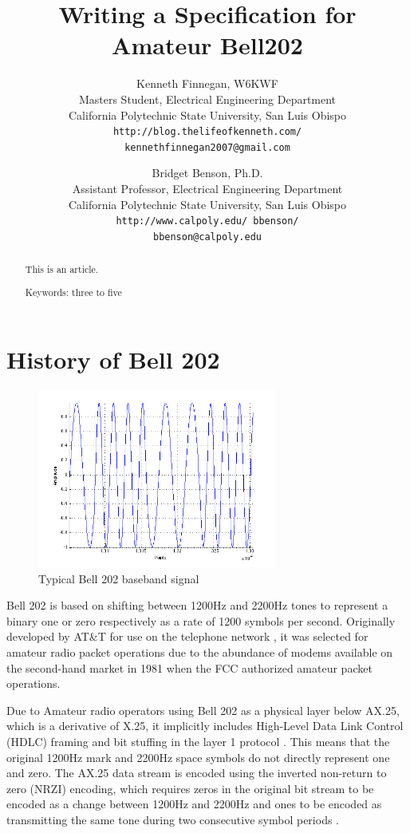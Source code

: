 \documentclass[12pt,letterpaper]{article}
\title{Writing a Specification for Amateur Bell202}
\author{Kenneth Finnegan, W6KWF\\
\small Masters Student, Electrical Engineering Department\\
\small California Polytechnic State University, San Luis Obispo\\
\small \texttt{http://blog.thelifeofkenneth.com/}\\
\small \texttt{kennethfinnegan2007@gmail.com}\\
\and
Bridget Benson, Ph.D.\\
\small Assistant Professor, Electrical Engineering Department\\
\small California Polytechnic State University, San Luis Obispo\\
\small \texttt{http://www.calpoly.edu/~bbenson/}\\
\small \texttt{bbenson@calpoly.edu}}
\begin{document}
\maketitle

\begin{abstract}
	This is an article.

	Keywords: three to five
\end{abstract}


\section{History of Bell 202}
\label{sec:bell202history}

\begin{figure}
	\centering
	\includegraphics[width=0.7\textwidth]{src/bell202sample}
	\caption{Typical Bell 202 baseband signal}
	\label{fig:bell202sample}
\end{figure}

Bell 202 is based on shifting between 1200Hz and 2200Hz tones to
represent a binary one or zero respectively as a rate of 
1200 symbols per second.
Originally developed by AT\&T for use on the telephone network \cite{202tspec},
it was selected for amateur radio packet operations due to the abundance
of modems available on the second-hand market in 1981 when the FCC authorized
amateur packet operations.

Due to Amateur radio operators
using Bell 202 as a physical layer below AX.25, which is a derivative of
X.25, it implicitly includes High-Level Data Link Control (HDLC) 
framing and bit stuffing in the layer 1 protocol \cite{n1vgphy}.
This means that the original 1200Hz mark and 2200Hz space symbols
do not directly represent one and zero.
The AX.25 data stream is encoded using the 
inverted non-return to zero (NRZI) encoding,
which requires zeros in the original bit stream to be encoded as a change
between 1200Hz and 2200Hz and ones to be encoded as transmitting the same
tone during two consecutive symbol periods \cite{iso13239}.
\end{document}
